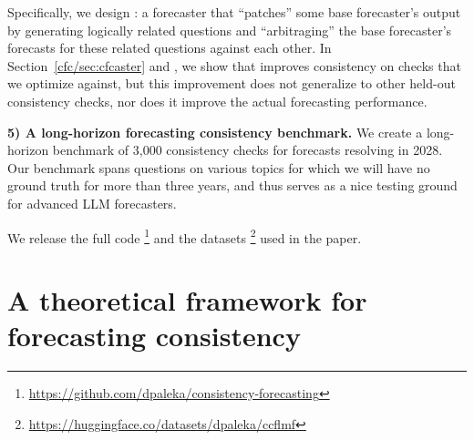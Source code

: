 Specifically, we design \CFCaster{}: a forecaster that ``patches'' some base forecaster's output by generating logically related questions and ``arbitraging'' the base forecaster's forecasts for these related questions against each other.
In Section~\ref{cfc/sec:cfcaster} and , we show that \CFCaster{} improves consistency on checks that we optimize against, but this improvement does not generalize to other held-out consistency checks, nor does it improve the actual forecasting performance.

\textbf{5) A long-horizon forecasting consistency benchmark.}
We create a long-horizon benchmark of 3,000 consistency checks for forecasts resolving in 2028. Our benchmark spans questions on various topics for which we will have no ground truth for more than three years, and thus serves as a nice testing ground for advanced LLM forecasters.


We release the full code \footnote{\url{https://github.com/dpaleka/consistency-forecasting}} and the datasets \footnote{\url{https://huggingface.co/datasets/dpaleka/ccflmf}} used in the paper.


\section{A theoretical framework for forecasting consistency}
\label{cfc/sec:background}
\label{cfc/sec:forecasting}



